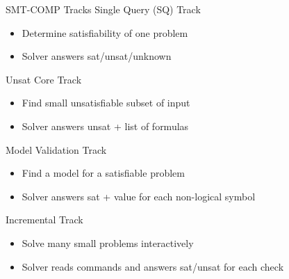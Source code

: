 \documentclass[table]{beamer}
\def\emph#1{\textcolor{MYblue}{#1}}
\begin{document}
\begin{frame}[fragile]{SMT-COMP Tracks}
  \emph{Single Query (SQ) Track}
  \begin{itemize}
  \item Determine satisfiability of one problem
  \item Solver answers \emph{sat/unsat/unknown}
  \end{itemize}
  \medskip

  \emph{Unsat Core Track}
  \begin{itemize}
  \item Find small unsatisfiable subset of input
  \item Solver answers \emph{unsat + list of formulas}
  \end{itemize}
  \medskip

  \emph{Model Validation Track}
  \begin{itemize}
  \item Find a model for a satisfiable problem
  \item Solver answers \emph{sat + value} for each non-logical symbol
  \end{itemize}
  \medskip

  \emph{Incremental Track}
  \begin{itemize}
  \item Solve many small problems interactively
  \item Solver reads commands and answers \emph{sat/unsat} for each check
  \end{itemize}
\end{frame}



\end{document}
